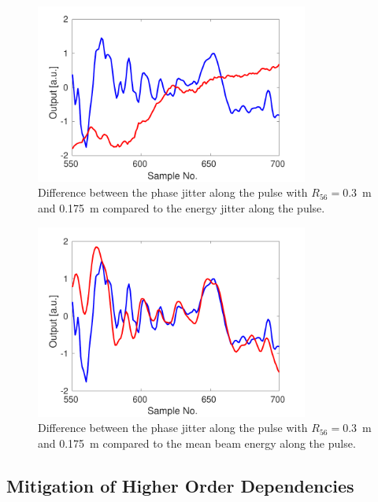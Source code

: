 \begin{figure}
  \centering
  \includegraphics[width=0.8\textwidth]{Figures/propagation/stdPhaseVsStdEnergyAlong}
  \caption{Difference between the phase jitter along the pulse with \(R_{56} = 0.3\)~m and 0.175~m compared to the energy jitter along the pulse.}
  \label{f:stdPhaseVsStdEnergyAlong}
\end{figure}

\begin{figure}
  \centering
  \includegraphics[width=0.8\textwidth]{Figures/propagation/stdPhaseVsMeanEnergyAlong}
  \caption{Difference between the phase jitter along the pulse with \(R_{56} = 0.3\)~m and 0.175~m compared to the mean beam energy along the pulse.}
  \label{f:stdPhaseVsMeanEnergyAlong}
\end{figure}

\subsection{Mitigation of Higher Order Dependencies}
\label{ss:t566Mitigation}

